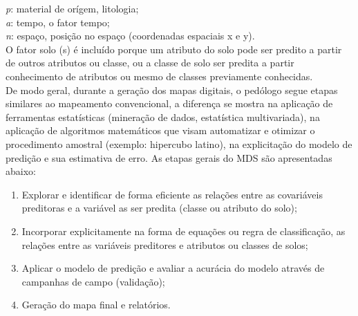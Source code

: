 \emph{p}: material de orígem, litologia;\\
\emph{a}: tempo, o fator tempo;\\
\emph{n}: espaço, posição no espaço (coordenadas espaciais x e y).\\
O fator solo (s) é incluído porque um atributo do solo pode ser predito a partir de outros atributos ou classe, ou a classe de solo ser predita a partir conhecimento de atributos ou mesmo de classes previamente conhecidas.\\
De modo geral, durante a geração dos mapas digitais, o pedólogo segue etapas similares ao mapeamento convencional, a diferença se mostra na aplicação de ferramentas estatísticas (mineração de dados, estatística multivariada), na aplicação de algoritmos matemáticos que visam automatizar e otimizar o procedimento amostral (exemplo: hipercubo latino), na explicitação do modelo de predição e sua estimativa de erro. As etapas gerais do MDS são apresentadas abaixo:
\begin{enumerate}
\item Explorar e identificar de forma eficiente as relações entre as covariáveis preditoras e a variável as ser predita (classe ou atributo do solo);
\item Incorporar explicitamente na forma de equações ou regra de classificação, as relações entre as variáveis preditores e atributos ou classes de solos;
\item Aplicar o modelo de predição e avaliar a acurácia do modelo através de campanhas de campo (validação);
\item Geração do mapa final e relatórios.
\end{enumerate}

